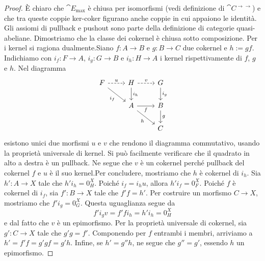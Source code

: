 \begin{proof}
  È chiaro che $\cat E_{\max}$ è chiusa per isomorfismi (vedi
  definizione di \(\cat C^{\to\to}\)) e che tra queste coppie ker-coker
  figurano anche coppie in cui appaiono le identità. Gli assiomi di
  pullback e pushout sono parte della definizione di categorie
  quasi-abeliane. Dimostriamo che la classe dei cokernel è chiusa sotto
  composizione. Per i kernel si ragiona dualmente.\newline Siano
  $f: A \to B$ e $g: B \to C$ due cokernel e $h := gf$. Indichiamo con
  \(i_f : F \to A\), \(i_g : G \to B\) e \(i_h : H \to A\) i kernel
  rispettivamente di \(f\), \(g\) e \(h\). Nel diagramma
  \[
    \begin{tikzcd}
      F \ar["{i_f}", dr, swap] \ar["{u}", r, dashed] & H \ar["{i_h}", d]
      \ar["{v}", r, dashed] &
      G \ar["{i_g}", d] \\
      & A \ar["{h}", dr, swap] \ar["{f}", r, swap] & B \ar["{g}", d] \\
      & & C
    \end{tikzcd}
  \]
  esistono unici due morfismi $u$ e $v$ che rendono il diagramma
  commutativo, usando la proprietà universale di kernel. Si può
  facilmente verificare che il quadrato in alto a destra è un
  pullback. Ne segue che \(v\) è un cokernel perché pullback del
  cokernel \(f\) e $u$ è il suo kernel.\newline Per concludere, mostriamo che
  \(h\) è cokernel di \(i_h\). Sia \(h' : A \to X\) tale che
  \(h'i_h = 0_H^X\). Poiché \(i_f = i_h u\), allora \(h'i_f =
  0_F^X\). Poiché \(f\) è cokernel di \(i_f\), sia \(f' : B \to X\) tale
  che \(f'f = h'\). Per costruire un morfismo \(C \to X\), mostriamo che
  \(f' i_g = 0_G^X\). Questa uguaglianza segue da
  \[
    f' i_g v = f' f i_h = h' i_h = 0_H^X
  \]
  e dal fatto che \(v\) è un epimorfismo. Per la proprietà universale di
  cokernel, sia \(g' : C \to X\) tale che \(g' g = f'\). Componendo per
  \(f\) entrambi i membri, arriviamo a \(h' = f'f = g'gf =
  g'h\). Infine, se \(h' = g''h\), ne segue che \(g'' = g'\), essendo
  \(h\) un epimorfismo.
\end{proof}






